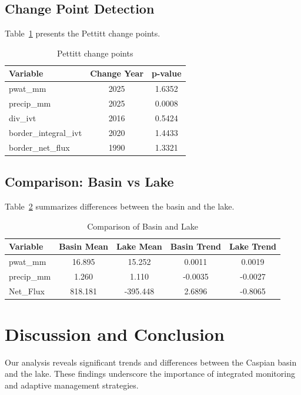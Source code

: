 \documentclass[12pt,a4paper]{article}
\begin{document}
\subsection{Change Point Detection}
Table~\ref{tab:pettitt} presents the Pettitt change points.
\begin{table}[h]
\centering
\caption{Pettitt change points}
\label{tab:pettitt}
\begin{tabular}{lcc}
\toprule
Variable & Change Year & p-value \\
\midrule
pwat_mm & 2025 & 1.6352 \\
precip_mm & 2025 & 0.0008 \\
div_ivt & 2016 & 0.5424 \\
border_integral_ivt & 2020 & 1.4433 \\
border_net_flux & 1990 & 1.3321 \\

\bottomrule
\end{tabular}
\end{table}

\subsection{Comparison: Basin vs Lake}
Table~\ref{tab:comparison} summarizes differences between the basin and the lake.
\begin{table}[h]
\centering
\caption{Comparison of Basin and Lake}
\label{tab:comparison}
\begin{tabular}{lcccc}
\toprule
Variable & Basin Mean & Lake Mean & Basin Trend & Lake Trend \\
\midrule
pwat_mm & 16.895 & 15.252 & 0.0011 & 0.0019 \\
precip_mm & 1.260 & 1.110 & -0.0035 & -0.0027 \\
Net_Flux & 818.181 & -395.448 & 2.6896 & -0.8065 \\

\bottomrule
\end{tabular}
\end{table}

\section{Discussion and Conclusion}
Our analysis reveals significant trends and differences between the Caspian basin and the lake. These findings underscore the importance of integrated monitoring and adaptive management strategies.



\end{document}
